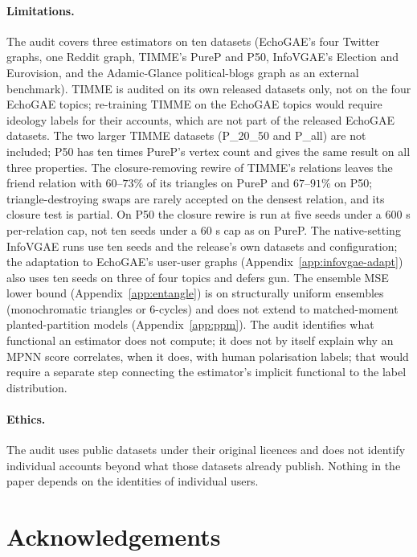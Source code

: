 \documentclass[letterpaper]{article} %
\begin{document}
\paragraph{Limitations.} The audit covers three estimators on
ten datasets (EchoGAE's four Twitter graphs, one Reddit
graph, TIMME's PureP and P50, InfoVGAE's Election and
Eurovision, and the Adamic-Glance political-blogs graph
\citep{AdamicGlance2005} as an external benchmark). TIMME is audited on its own released datasets only,
not on the four EchoGAE topics; re-training TIMME on the
EchoGAE topics would require ideology labels for their
accounts, which are not part of the released EchoGAE datasets.
The two larger TIMME datasets (P\_20\_50 and P\_all) are not
included; P50 has ten times PureP's vertex count and gives the
same result on all three properties. The closure-removing
rewire of TIMME's relations leaves the friend relation
with $60$--$73\%$ of its triangles on PureP and $67$--$91\%$
on P50; triangle-destroying swaps are rarely accepted on the
densest relation, and its closure test is partial. On P50 the
closure rewire is run at five seeds under a $600$ s per-relation
cap, not ten seeds under a $60$ s cap as on PureP. The native-setting InfoVGAE runs use ten seeds and the release's
own datasets and configuration; the adaptation to EchoGAE's
user-user graphs (Appendix~\ref{app:infovgae-adapt}) also uses
ten seeds on three of four topics and defers gun. The ensemble MSE lower bound
(Appendix~\ref{app:entangle}) is on structurally uniform
ensembles (monochromatic triangles or $6$-cycles) and does not
extend to matched-moment planted-partition models
(Appendix~\ref{app:ppm}). The audit identifies what functional
an estimator does not compute; it does not by itself explain
why an MPNN score correlates, when it does, with human
polarisation labels; that would require a separate step
connecting the estimator's implicit functional to the label
distribution.

\paragraph{Ethics.} The audit uses public datasets under their
original licences and does not identify individual accounts
beyond what those datasets already publish. Nothing in the paper
depends on the identities of individual users.

\section*{Acknowledgements}
\end{document}
